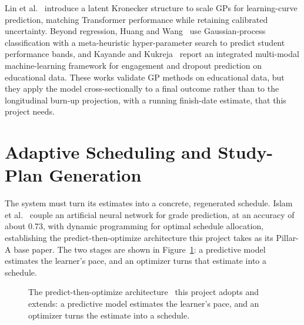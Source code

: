 Lin et al.~\cite{lin2024} introduce a latent Kronecker structure to scale GPs for learning-curve prediction, matching Transformer performance while retaining calibrated uncertainty. Beyond regression, Huang and Wang~\cite{huang2025} use Gaussian-process classification with a meta-heuristic hyper-parameter search to predict student performance bands, and Kayande and Kukreja~\cite{kayande2025} report an integrated multi-modal machine-learning framework for engagement and dropout prediction on educational data. These works validate GP methods on educational data, but they apply the model cross-sectionally to a final outcome rather than to the longitudinal burn-up projection, with a running finish-date estimate, that this project needs.

\section{Adaptive Scheduling and Study-Plan Generation}
The system must turn its estimates into a concrete, regenerated schedule. Islam et al.~\cite{islam2024} couple an artificial neural network for grade prediction, at an accuracy of about 0.73, with dynamic programming for optimal schedule allocation, establishing the predict-then-optimize architecture this project takes as its Pillar-A base paper. The two stages are shown in Figure~\ref{fig:predict-optimize}: a predictive model estimates the learner's pace, and an optimizer turns that estimate into a schedule.

\begin{figure}[htbp]
\centering
{}
\caption{The predict-then-optimize architecture~\cite{islam2024} this project adopts and extends: a predictive model estimates the learner's pace, and an optimizer turns the estimate into a schedule.}
\label{fig:predict-optimize}
\end{figure}

